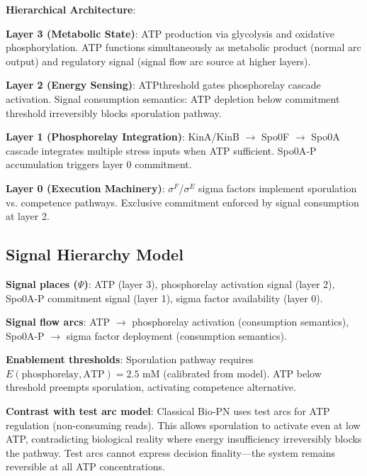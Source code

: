 \documentclass[twocolumn,11pt]{article}
\begin{document}
\vspace{3pt}
\noindent\textbf{Hierarchical Architecture}:

\vspace{3pt}
\noindent\textbf{Layer 3 (Metabolic State)}: ATP production via glycolysis and oxidative phosphorylation. ATP functions simultaneously as metabolic product (normal arc output) and regulatory signal (signal flow arc source at higher layers).

\vspace{3pt}
\noindent\textbf{Layer 2 (Energy Sensing)}: ATPthreshold gates phosphorelay cascade activation. Signal consumption semantics: ATP depletion below commitment threshold irreversibly blocks sporulation pathway.

\vspace{3pt}
\noindent\textbf{Layer 1 (Phosphorelay Integration)}: KinA/KinB $\to$ Spo0F $\to$ Spo0A cascade integrates multiple stress inputs when ATP sufficient. Spo0A-P accumulation triggers layer 0 commitment.

\vspace{3pt}
\noindent\textbf{Layer 0 (Execution Machinery)}: $\sigma^F$/$\sigma^E$ sigma factors implement sporulation vs. competence pathways. Exclusive commitment enforced by signal consumption at layer 2.

\subsection{Signal Hierarchy Model}

\vspace{3pt}
\noindent\textbf{Signal places ($\Psi$)}: ATP (layer 3), phosphorelay activation signal (layer 2), Spo0A-P commitment signal (layer 1), sigma factor availability (layer 0).

\vspace{3pt}
\noindent\textbf{Signal flow arcs}: ATP $\to$ phosphorelay activation (consumption semantics), Spo0A-P $\to$ sigma factor deployment (consumption semantics).

\vspace{3pt}
\noindent\textbf{Enablement thresholds}: Sporulation pathway requires $E(\text{phosphorelay}, \text{ATP}) = 2.5$ mM (calibrated from model). ATP below threshold preempts sporulation, activating competence alternative.

\vspace{3pt}
\noindent\textbf{Contrast with test arc model}: Classical Bio-PN uses test arcs for ATP regulation (non-consuming reads). This allows sporulation to activate even at low ATP, contradicting biological reality where energy insufficiency irreversibly blocks the pathway. Test arcs cannot express decision finality---the system remains reversible at all ATP concentrations.
\end{document}
